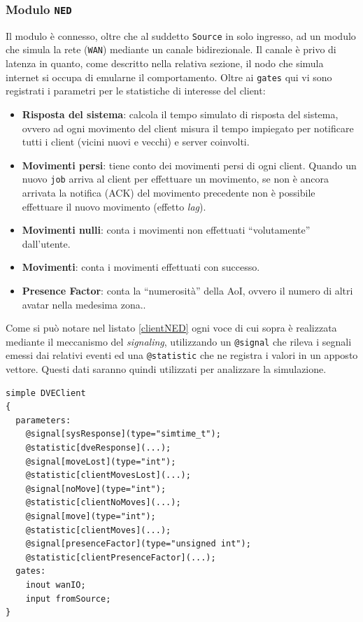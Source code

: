 \documentclass[a4paper, 11pt, oneside]{book}
\newcommand{\files}[1]{\texttt{#1}}
\theoremstyle{definition}
\theoremstyle{remark}
\begin{document}
\subsubsection{Modulo \files{NED}}
Il modulo è connesso, oltre che al suddetto \texttt{Source} in solo ingresso,
ad un modulo che simula la rete (\texttt{WAN}) mediante un canale bidirezionale.
Il canale è privo di latenza in quanto, come descritto nella relativa sezione,
il nodo che simula internet si occupa di emularne il comportamento.
Oltre ai \texttt{gates} qui vi sono registrati i parametri per le statistiche
di interesse del client:
\begin{itemize}
\item \textbf{Risposta del sistema}: calcola il tempo simulato di risposta
del sistema, ovvero ad ogni movimento del client misura il tempo impiegato
per notificare tutti i client (vicini nuovi e vecchi) e server coinvolti.
\item \textbf{Movimenti persi}: tiene conto dei movimenti persi di ogni client.
Quando un nuovo \texttt{job} arriva al client per effettuare un movimento, se
non è ancora arrivata la notifica (ACK) del movimento precedente non è possibile
effettuare il nuovo movimento (effetto \emph{lag}).
\item \textbf{Movimenti nulli}: conta i movimenti non effettuati ``volutamente''
dall'utente.
\item \textbf{Movimenti}: conta i movimenti effettuati con successo.
\item \textbf{Presence Factor}: conta la ``numerosità'' della AoI, ovvero
il numero di altri avatar nella medesima zona..
\end{itemize}
Come si può notare nel listato \ref{clientNED} ogni voce di cui sopra è
realizzata mediante il meccanismo del \emph{signaling}, utilizzando un
\texttt{@signal} che rileva i segnali emessi dai relativi eventi
ed una \texttt{@statistic} che ne registra i valori in un apposto vettore.
Questi dati saranno quindi utilizzati per analizzare la simulazione.

\begin{lstlisting}[caption = {Il Modulo DVEClient.},
                   label = {clientNED}]
simple DVEClient
{
  parameters:
    @signal[sysResponse](type="simtime_t");
    @statistic[dveResponse](...);
    @signal[moveLost](type="int");
    @statistic[clientMovesLost](...);
    @signal[noMove](type="int");
    @statistic[clientNoMoves](...);
    @signal[move](type="int");
    @statistic[clientMoves](...);
    @signal[presenceFactor](type="unsigned int");
    @statistic[clientPresenceFactor](...);
  gates:
    inout wanIO;
    input fromSource;
}
\end{lstlisting}
\end{document}
